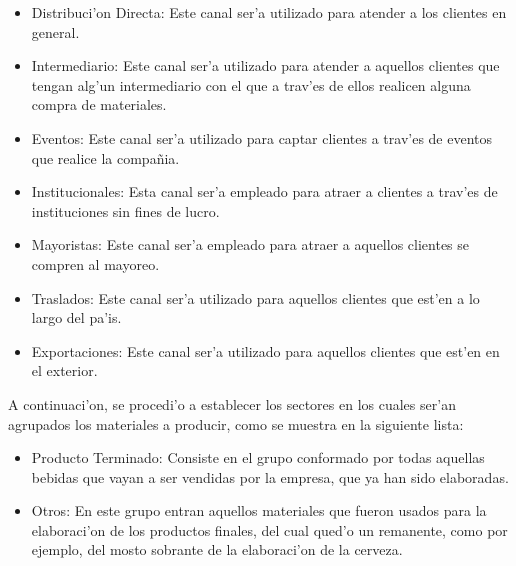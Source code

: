 \begin{itemize}
\item Distribuci'on Directa: Este canal ser'a utilizado para atender a los clientes en general.
\item Intermediario: Este canal ser'a utilizado para atender a aquellos clientes que tengan alg'un intermediario con el que a trav'es de ellos realicen alguna compra de materiales.
\item Eventos: Este canal ser'a utilizado para captar clientes a trav'es de eventos que realice la compa\~nia. 
\item Institucionales: Esta canal ser'a empleado para atraer a clientes a trav'es de instituciones sin fines de lucro.
\item Mayoristas: Este canal ser'a empleado para atraer a aquellos clientes se compren al mayoreo.
\item Traslados: Este canal ser'a utilizado para aquellos clientes que est'en a lo largo del pa'is.
\item Exportaciones: Este canal ser'a utilizado para aquellos clientes que est'en en el exterior.
\end{itemize}
	A continuaci'on, se procedi'o a establecer los sectores en los cuales ser'an agrupados los materiales a producir, como se muestra en la siguiente lista:
\begin{itemize}
\item Producto Terminado: Consiste en el grupo conformado por todas aquellas bebidas que vayan a ser vendidas por la empresa, que ya han sido elaboradas.
\item Otros: En este grupo entran aquellos materiales que fueron usados para la elaboraci'on de los productos finales, del cual qued'o un remanente, como por ejemplo, del mosto sobrante de la elaboraci'on de la cerveza.
\end{itemize}

